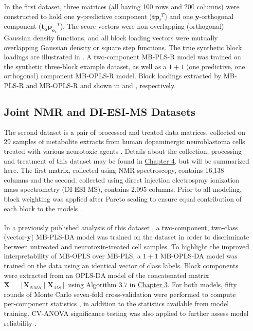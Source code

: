 \begin{doublespace}
In the first dataset, three matrices (all having 100 rows and 200 columns)
were constructed to hold one $\mathbf{y}$-predictive component
($\mathbf{t} {\mathbf{p}_i}^T$) and one $\mathbf{y}$-orthogonal component
($\mathbf{t_o} {\mathbf{p_o}_i}^T$). The score vectors were non-overlapping
(orthogonal) Gaussian density functions, and all block loading vectors were
mutually overlapping Gaussian density or square step functions. The true
synthetic block loadings are illustrated in .
A two-component MB-PLS-R model was trained on the synthetic three-block
example dataset, as well as a $1+1$ (one predictive, one orthogonal)
component MB-OPLS-R model. Block loadings extracted by MB-PLS-R and
MB-OPLS-R and shown in  and
, respectively.
\end{doublespace}

\subsection{Joint \hnmr{} NMR and DI-ESI-MS Datasets}

\begin{doublespace}
The second dataset is a pair of processed and treated data matrices, collected
on 29 samples of metabolite extracts from human dopaminergic neuroblastoma
cells treated with various neurotoxic agents \cite{lei:acscb2014}. Details
about the collection, processing and treatment of this dataset may be found
in \hyperlink{section.4.3}{Chapter 4}, but will be summarized here. The
first matrix, collected using \hnmr{} NMR spectroscopy, contains 16,138
columns and the second, collected using direct injection electrospray
ionization mass spectrometry (DI-ESI-MS), contains 2,095 columns. Prior
to all modeling, block weighting was applied after Pareto scaling to ensure
equal contribution of each block to the models \cite{smilde:jchemo2003}.
\\\\
In a previously published analysis of this dataset \cite{marshall:metab2015},
a two-component, two-class (vector-$\mathbf{y}$) MB-PLS-DA model was trained
on the dataset in order to discriminate between untreated and
neurotoxin-treated cell samples. To highlight the improved interpretability
of MB-OPLS over MB-PLS, a $1+1$ MB-OPLS-DA model was trained on the data
using an identical vector of class labels. Block components were extracted
from an OPLS-DA model of the concatenated matrix
$\mathbf{X}=[\mathbf{X}_{NMR}\mid\mathbf{X}_{MS}]$ using Algorithm 3.7 in
\hyperlink{subsection.3.5.6}{Chapter 3}. For both models, fifty rounds of
Monte Carlo seven-fold cross-validation \cite{shao:jasa1993,xu:cils2001}
were performed to compute per-component \qsq{} statistics
\cite{wold:cils2001}, in addition to the \rsq{} statistics available
from model training. CV-ANOVA significance testing was also applied
to further assess model reliability \cite{eriksson:jchemo2008}.
\end{doublespace}

